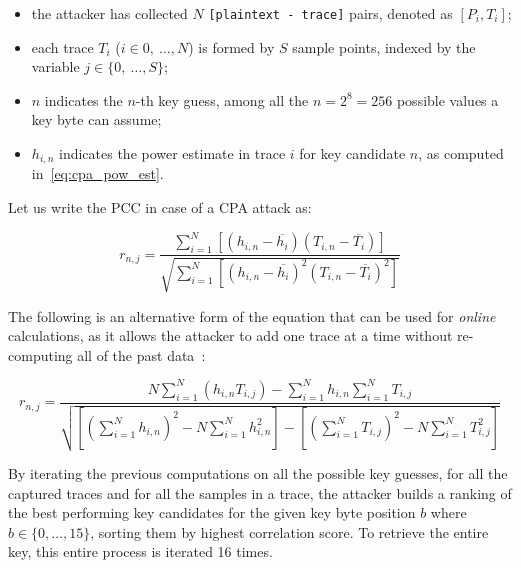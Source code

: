             \begin{itemize}
                \item the attacker has collected $N$ \texttt{[plaintext - trace]} pairs, denoted as $[P_i, T_i]$;
                \item each trace $T_i$ ($i \in {0,\ \dots, N}$) is formed by $S$ sample points, indexed by the variable $j \in \{0,\ \dots, S\}$;
                \item $n$ indicates the $n$-th key guess, among all the $n = 2^8 = 256$ possible values a key byte can assume;
                \item $h_{i,n}$ indicates the power estimate in trace $i$ for key candidate $n$, as computed in~\ref{eq:cpa_pow_est}.
            \end{itemize}
            
            Let us write the PCC in case of a CPA attack as:

            \begin{equation}\label{eq:pearson}
                r_{n,j} = \frac{\sum^{N}_{i=1} [(h_{i,n} - \overline{h_i})(T_{i,n} - \overline{T_i})]}{\sqrt{\sum^{N}_{i=1} [(h_{i,n} - \overline{h_i})^2(T_{i,n} - \overline{T_i})^2]}}
            \end{equation}

            \noindent The following is an alternative form of the equation that can be used for \emph{online} calculations, as it allows the attacker to add one trace at a time without re-computing all of the past data~\cite{cpanewae}:

            \begin{equation}\label{eq:pearson_alt}
                r_{n,j} = \frac{N \sum^{N}_{i=1} (h_{i,n} T_{i,j}) - \sum^{N}_{i=1} h_{i,n} \sum^{N}_{i=1} T_{i,j}}{\sqrt{[(\sum^{N}_{i=1}h_{i,n})^2 - N \sum^{N}_{i=1} h^2_{i,n}] - [(\sum^{N}_{i=1} T_{i,j})^2 - N \sum^{N}_{i=1} T^2_{i,j}]}}
            \end{equation}
            
            \noindent By iterating the previous computations on all the possible key guesses, for all the captured traces and for all the samples in a trace, the attacker builds a ranking of the best performing key candidates for the given key byte position $b$ where $b \in \{0, \dots, 15\}$, sorting them by highest correlation score. To retrieve the entire key, this entire process is iterated 16 times.
            

